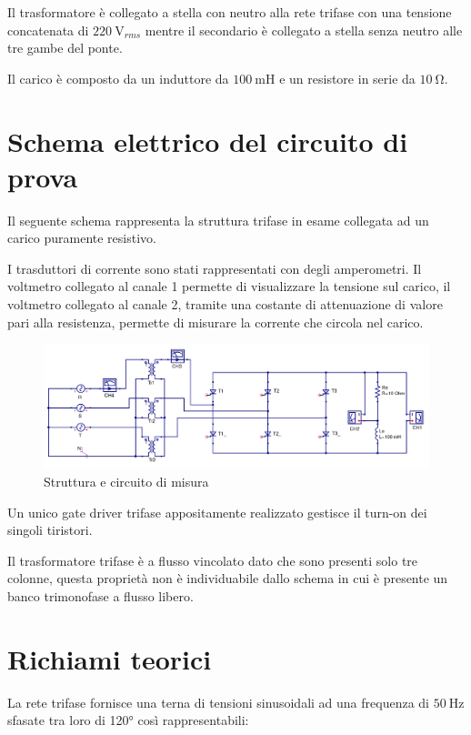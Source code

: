 \documentclass[a4paper,10pt]{article}
\begin{document}
Il trasformatore è collegato a stella con neutro alla rete trifase con una tensione
concatenata di $\SI{220}{\volt_{rms}}$ mentre il secondario è collegato a stella senza
neutro alle tre gambe del ponte.

Il carico è composto da un induttore da $\SI{100}{\milli\henry}$ e
un resistore in serie da $\SI{10}{\ohm}$.



\section{Schema elettrico del circuito di prova}
Il seguente schema rappresenta la struttura trifase in esame collegata ad un
carico puramente resistivo.

I trasduttori di corrente sono stati rappresentati con degli
amperometri. Il voltmetro collegato al canale 1 permette di visualizzare la 
tensione sul carico, il voltmetro collegato al canale 2, tramite una costante di 
attenuazione di valore pari alla resistenza, permette di misurare 
la corrente che circola nel carico.


\begin{figure}[H]
 \centering
 \includegraphics[keepaspectratio=true,width=1\linewidth]{img/circuito_qucs.png}
 \caption{Struttura e circuito di misura}
 \label{fig:circuito}
\end{figure}

Un unico gate driver trifase appositamente realizzato gestisce il turn-on
dei singoli tiristori.

Il trasformatore trifase è a flusso vincolato dato che sono presenti 
solo tre colonne, questa proprietà non è individuabile dallo schema in cui 
è presente un banco trimonofase a flusso libero.

\section{Richiami teorici}
La rete trifase fornisce una terna di tensioni sinusoidali ad una frequenza di
$\SI{50}{\hertz}$ sfasate tra loro di \ang{120}
così rappresentabili:
\end{document}
